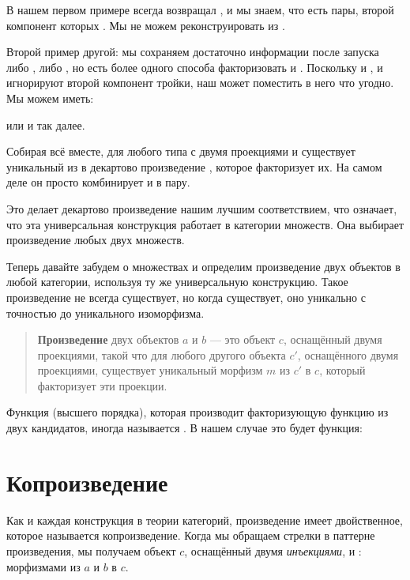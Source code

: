 В нашем первом примере  всегда возвращал , и мы
знаем, что есть пары, второй компонент которых . Мы
не можем реконструировать  из .

Второй пример другой: мы сохраняем достаточно информации после
запуска либо , либо , но есть более одного способа
факторизовать  и . Поскольку и , и
 игнорируют второй компонент тройки, наш 
может поместить в него что угодно. Мы можем иметь:


или
и так далее.

Собирая всё вместе, для любого типа  с двумя проекциями
 и  существует уникальный  из 
в декартово произведение , которое факторизует их. На самом деле
он просто комбинирует  и  в пару.

Это делает декартово произведение  нашим лучшим соответствием, что
означает, что эта универсальная конструкция работает в категории множеств. Она
выбирает произведение любых двух множеств.

Теперь давайте забудем о множествах и определим произведение двух объектов в любой
категории, используя ту же универсальную конструкцию. Такое произведение не
всегда существует, но когда существует, оно уникально с точностью до уникального изоморфизма.

\begin{quote}
  \textbf{Произведение} двух объектов $a$ и $b$ --- это объект
  $c$, оснащённый двумя проекциями, такой что для любого другого объекта
  $c'$, оснащённого двумя проекциями, существует уникальный морфизм
  $m$ из $c'$ в $c$, который факторизует эти проекции.
\end{quote}

\noindent
Функция (высшего порядка), которая производит факторизующую функцию
 из двух кандидатов, иногда называется
. В нашем случае это будет функция:


\section{Копроизведение}

Как и каждая конструкция в теории категорий, произведение имеет двойственное,
которое называется копроизведение. Когда мы обращаем стрелки в паттерне произведения,
мы получаем объект $c$, оснащённый двумя
\emph{инъекциями},  и : морфизмами из $a$
и $b$ в $c$.

